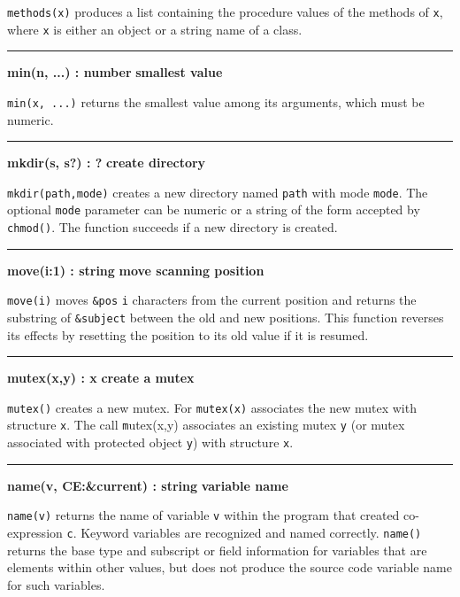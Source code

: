 \noindent
\texttt{methods(x)} produces a list containing the procedure values of
the methods of \texttt{x}, where \texttt{x} is either an object or a
string name of a class.

\bigskip\hrule\vspace{0.1cm}
\noindent
{\bf min(n, ...) : number } \hfill {\bf smallest value}

\noindent
{}\texttt{min(x, ...)} returns the smallest value among its
arguments, which must be numeric.

\bigskip\hrule\vspace{0.1cm}
\noindent
{\bf mkdir(s, s?) : ? } \hfill {\bf create directory}

\noindent
{}
\texttt{mkdir(path,mode)} creates a new directory named \texttt{path} with
mode \texttt{mode}. The optional \texttt{mode} parameter can be numeric or a
string of the form accepted by \texttt{chmod()}. The function succeeds
if a new directory is created.

\bigskip\hrule\vspace{0.1cm}
\noindent
{\bf move(i:1) : string } \hfill {\bf move scanning position}

\noindent
{}\texttt{move(i)} moves \texttt{\&pos} \texttt{i}
characters from the current position and returns the substring of
\texttt{\&subject} between the old and new positions. This function
reverses its effects by resetting the position to its old value if it
is resumed.

\bigskip\hrule\vspace{0.1cm}
\noindent
{\bf mutex(x,y) : x } \hfill {\bf create a mutex}

\noindent
{}\texttt{mutex()} creates a new mutex. For \texttt{mutex(x)}
associates the new mutex with structure \texttt{x}.
The call {\texttt mutex(x,y)} associates an existing mutex \texttt{y} (or
mutex associated with protected object \texttt{y}) with
structure \texttt{x}.

\bigskip\hrule\vspace{0.1cm}
\noindent
{\bf name(v, CE:\&current) : string } \hfill {\bf variable name}

\noindent
{}\texttt{name(v)} returns the name of variable \texttt{v}
within the program that created co-expression \texttt{c}. Keyword
variables are recognized and named correctly. \texttt{name()} returns
the base type and subscript or field information for variables that are
elements within other values, but does not produce the source code
variable name for such variables. 

